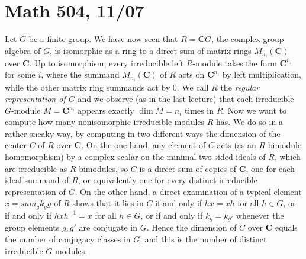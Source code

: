 \documentclass[10pt]{article}
\begin{document}
\section*{Math 504, 11/07}

Let $G$ be a finite group. We have now seen that $R=\mathbf CG$, the
complex group algebra of $G$, is isomorphic as a ring to a direct sum of
matrix rings $M_{n_i}(\mathbf C)$ over $\mathbf C$. Up to isomorphism,
every irreducible left $R$-module takes the form $\mathbf C^{n_i}$ for
some $i$, where the summand $M_{n_i}(\mathbf C)$ of $R$ acts on $\mathbf
C^{n_i}$ by left multiplication, while the other matrix ring summands
act by 0. We call $R$ the {\sl regular representation of $G$} and we
observe (as in the last lecture) that each irreducible $G$-module
$M=\mathbf C^{n_i}$ appears exactly $\dim M = n_i$ times in $R$. Now we
want to compute how many nonisomorphic irreducible modules $R$ has. We
do so in a rather sneaky way, by computing in two different ways the
dimension of the center $C$ of $R$ over $\mathbf C$. On the one hand,
any element of $C$ acts (as an $R$-bimodule homomorphism) by a complex
scalar on the minimal two-sided ideals of $R$, which are irreducible as
$R$-bimodules, so $C$ is a direct sum of copies of $\mathbf C$, one for
each ideal summand of $R$, or equivalently one for every distinct
irreducible representation of $G$. On the other hand, a direct
examination of a typical element $x=sum_g k_g g$ of $R$ shows that it
lies in $C$ if and only if $hx = xh$ for all $h\in G$, or if and only if
$hxh^{-1} = x$ for all $h\in G$, or if and only if $k_g = k_{g'}$
whenever the group elements $g,g'$ are conjugate in $G$. Hence the
dimension of $C$ over $\mathbf C$ equals the number of conjugacy classes
in $G$, and this is the number of distinct irreducible $G$-modules.
\end{document}
